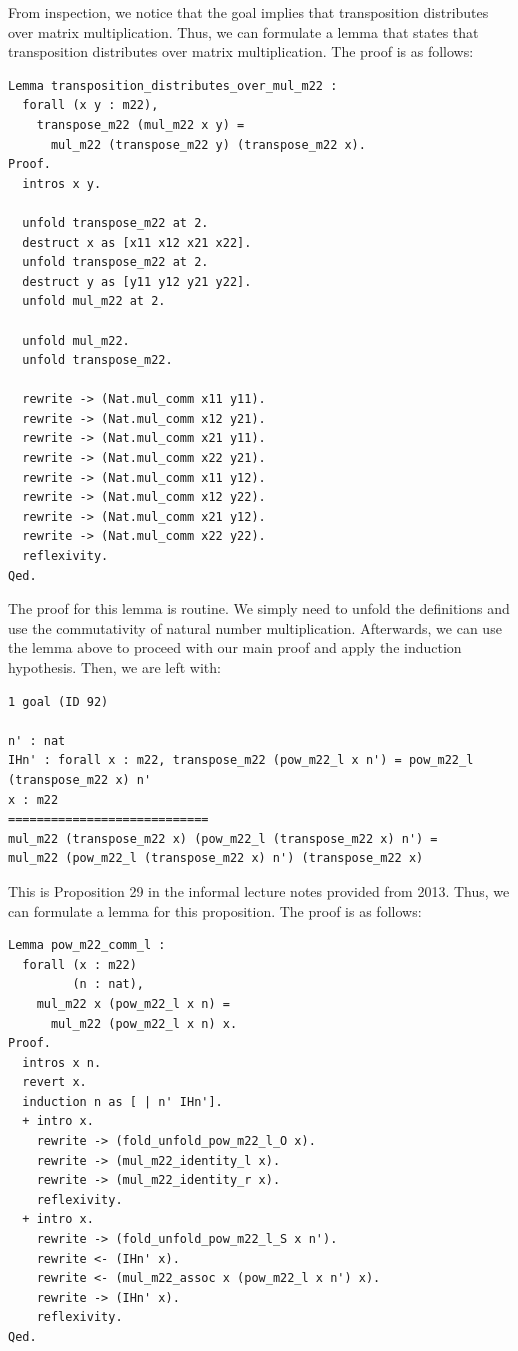 \documentclass{article}
\begin{document}
From inspection, we notice that the goal implies that transposition distributes over matrix multiplication. Thus, we can formulate a lemma that states that transposition distributes over matrix multiplication. The proof is as follows:

\begin{lstlisting}
Lemma transposition_distributes_over_mul_m22 :
  forall (x y : m22),
    transpose_m22 (mul_m22 x y) =
      mul_m22 (transpose_m22 y) (transpose_m22 x).
Proof.
  intros x y.  
  
  unfold transpose_m22 at 2.
  destruct x as [x11 x12 x21 x22].
  unfold transpose_m22 at 2.
  destruct y as [y11 y12 y21 y22].
  unfold mul_m22 at 2.

  unfold mul_m22.
  unfold transpose_m22.

  rewrite -> (Nat.mul_comm x11 y11). 
  rewrite -> (Nat.mul_comm x12 y21). 
  rewrite -> (Nat.mul_comm x21 y11).
  rewrite -> (Nat.mul_comm x22 y21).
  rewrite -> (Nat.mul_comm x11 y12).
  rewrite -> (Nat.mul_comm x12 y22).
  rewrite -> (Nat.mul_comm x21 y12).
  rewrite -> (Nat.mul_comm x22 y22). 
  reflexivity.
Qed.
\end{lstlisting}

The proof for this lemma is routine. We simply need to unfold the definitions and use the commutativity of natural number multiplication. Afterwards, we can use the lemma above to proceed with our main proof and apply the induction hypothesis. Then, we are left with:

\begin{lstlisting}
1 goal (ID 92)

n' : nat
IHn' : forall x : m22, transpose_m22 (pow_m22_l x n') = pow_m22_l (transpose_m22 x) n'
x : m22
============================
mul_m22 (transpose_m22 x) (pow_m22_l (transpose_m22 x) n') =
mul_m22 (pow_m22_l (transpose_m22 x) n') (transpose_m22 x)
\end{lstlisting}

This is Proposition 29 in the informal lecture notes provided from 2013. Thus, we can formulate a lemma for this proposition. The proof is as follows:

\begin{lstlisting}
Lemma pow_m22_comm_l :
  forall (x : m22)
         (n : nat),
    mul_m22 x (pow_m22_l x n) =
      mul_m22 (pow_m22_l x n) x.
Proof.
  intros x n.
  revert x.
  induction n as [ | n' IHn'].
  + intro x.
    rewrite -> (fold_unfold_pow_m22_l_O x).
    rewrite -> (mul_m22_identity_l x).
    rewrite -> (mul_m22_identity_r x).
    reflexivity.
  + intro x.
    rewrite -> (fold_unfold_pow_m22_l_S x n').
    rewrite <- (IHn' x).
    rewrite <- (mul_m22_assoc x (pow_m22_l x n') x).
    rewrite -> (IHn' x).
    reflexivity.
Qed.
\end{lstlisting}
\end{document}
